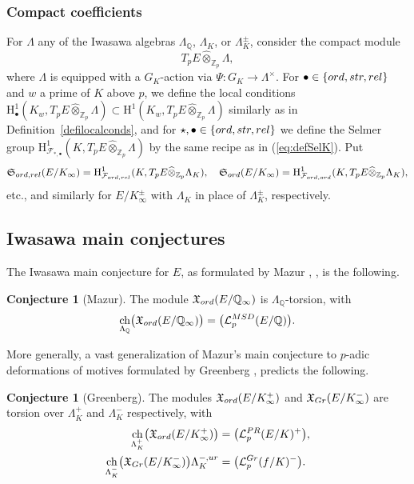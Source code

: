 \documentclass[a4paper,10pt]{amsart}
\numberwithin{equation}{section}
\numberwithin{equation}{section}
\theoremstyle{plain}
\theoremstyle{definition}
\newtheorem{conjecture}[thm]{Conjecture}
\theoremstyle{definition}
\theoremstyle{plain}
\theoremstyle{plain}
\theoremstyle{plain}
\theoremstyle{plain}
\newcommand{\Z}{\mathbb{Z}}
\newcommand{\Q}{\mathbb{Q}}
\newcommand{\X}{\mathfrak{X}}
\DeclareMathOperator{\ch}{ch}
\newcommand{\Lcal}{\mathcal{L}}
\newcommand{\Fcal}{\mathcal{F}}
\newcommand{\rH}{\mathrm{H}}
\begin{document}
\subsubsection{Compact coefficients} 

For $\Lambda$ any of the Iwasawa algebras $\Lambda_\Q$, $\Lambda_K$, or $\Lambda_K^\pm$, consider the compact module
\[
T_pE\widehat\otimes_{\Z_p}\Lambda,
\]
where $\Lambda$ is equipped with a $G_K$-action via $\Psi:G_K\rightarrow\Lambda^\times$. For $\bullet\in\{\rm ord, \rm str, \rm rel\}$ and $w$ a prime of $K$ above $p$, we define the local conditions $\rH^1_{\bullet}(K_w,T_pE\widehat\otimes_{\Z_p}\Lambda)\subset\rH^1(K_w,T_pE\widehat\otimes_{\Z_p}\Lambda)$ similarly as in Definition~\ref{defilocalconds}, and for $\star,\bullet\in\{\rm ord,\rm str,\rm rel\}$ we define the Selmer group $\rH^1_{\Fcal_{*,\bullet}}(K,T_pE\widehat\otimes_{\Z_p}\Lambda)$ by the same recipe as in (\ref{eq:defSelK}). Put
\[
\mathfrak{S}_{\rm ord,\rm rel}(E/K_\infty)=\rH^1_{\Fcal_{\rm ord,\rm rel}}(K,T_pE\widehat\otimes_{\Z_p}\Lambda_K),\quad
\mathfrak{S}_{\rm ord}(E/K_\infty)=\rH^1_{\Fcal_{\rm ord,\rm ord}}(K,T_pE\widehat\otimes_{\Z_p}\Lambda_K),
\]
etc., and similarly for $E/K_\infty^\pm$ with $\Lambda_K$ in place of $\Lambda_K^\pm$, respectively.



\subsection{Iwasawa main conjectures}

The Iwasawa main conjecture for $E$, as formulated by Mazur \cite{mazur-towers}, \cite[\S{9.5}, Conj.~3]{M-SwD}, is the following. 

\begin{conjecture}[Mazur]\label{conj:IMC}
The module $\X_{\rm ord}(E/\Q_{\infty})$ is $\Lambda_\Q$-torsion, with 
\[
\ch_{\Lambda_\Q}\bigl(\X_{\rm ord}(E/\Q_{\infty})\bigr)=\bigl(\Lcal_p^{\rm MSD}(E/\Q)\bigr).
\]
\end{conjecture}

More generally, a vast generalization of Mazur's main conjecture to $p$-adic deformations of motives formulated by Greenberg \cite{greenberg-reps,greenberg-motives},
predicts the following.

\begin{conjecture}[Greenberg]\label{conj:IMC-K}
The modules $\X_{\rm ord}(E/K^+_\infty)$ and $\X_{\rm Gr}(E/K_\infty^-)$ are torsion over $\Lambda_K^+$ and $\Lambda_K^-$ respectively, with
\begin{align*}
\ch_{\Lambda_K^+}\bigl(\X_{\rm ord}(E/K_{\infty}^+)\bigr)&=\bigl(\Lcal_p^{\rm PR}(E/K)^+\bigr),\\
\ch_{\Lambda_K^-}\bigl(\X_{\rm Gr}(E/K_{\infty}^-)\bigr)\Lambda_K^{-,\rm ur}&=\bigl(\Lcal_p^{\rm Gr}(f/K)^-\bigr).
\end{align*}
\end{conjecture}
\end{document}

